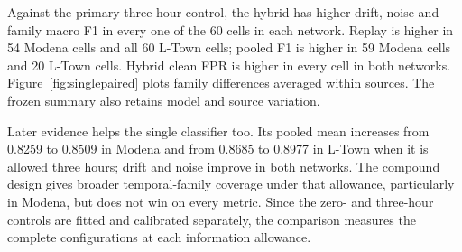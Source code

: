 Against the primary three-hour control, the hybrid has higher drift, noise and family macro F1 in every one of the 60 cells in each network. Replay is higher in 54 Modena cells and all 60 L-Town cells; pooled F1 is higher in 59 Modena cells and 20 L-Town cells. Hybrid clean FPR is higher in every cell in both networks. Figure~\ref{fig:singlepaired} plots family differences averaged within sources. The frozen summary also retains model and source variation.

Later evidence helps the single classifier too. Its pooled mean increases from 0.8259 to 0.8509 in Modena and from 0.8685 to 0.8977 in L-Town when it is allowed three hours; drift and noise improve in both networks. The compound design gives broader temporal-family coverage under that allowance, particularly in Modena, but does not win on every metric. Since the zero- and three-hour controls are fitted and calibrated separately, the comparison measures the complete configurations at each information allowance.
